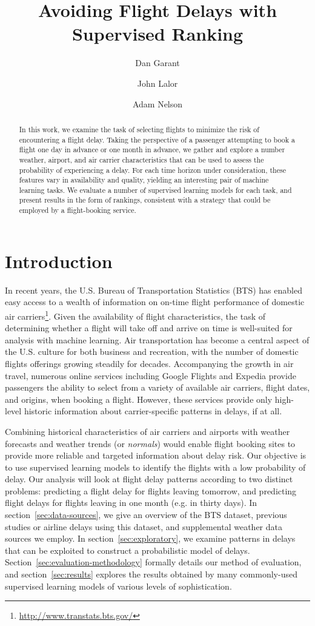 \documentclass{article}
\title{Avoiding Flight Delays with Supervised Ranking}
\author{Dan Garant \and John Lalor \and Adam Nelson}
\date{}
\begin{document}
\maketitle

\begin{abstract}
In this work, we examine the task of selecting flights to minimize the risk of encountering a flight delay.
Taking the perspective of a passenger attempting to book a flight one day in advance or one month in advance, we gather and explore a number weather, airport, and air carrier characteristics that can be used to assess the probability of experiencing a delay.
For each time horizon under consideration, these features vary in availability and quality, yielding an interesting pair of machine learning tasks.
We evaluate a number of supervised learning models for each task, and present results in the form of rankings, consistent with a strategy that could be employed by a flight-booking service.
\end{abstract}

\section{Introduction}

In recent years, the U.S. Bureau of Transportation Statistics (BTS)  has enabled easy access to a wealth of information on on-time flight performance of domestic air carriers\footnote{\url{http://www.transtats.bts.gov/}}.
Given the availability of flight characteristics, the task of determining whether a flight will take off and arrive on time is well-suited for analysis with machine learning.
Air transportation has become a central aspect of the U.S. culture for both business and recreation, with the number of domestic flights offerings growing steadily for decades.
Accompanying the growth in air travel, numerous online services including Google Flights and Expedia provide passengers the ability to select from a variety of available air carriers, flight dates, and origins, when booking a flight.
However, these services provide only high-level historic information about carrier-specific patterns in delays, if at all.

Combining historical characteristics of air carriers and airports with weather forecasts and weather trends (or \emph{normals}) would enable flight booking sites to provide more reliable and targeted information about delay risk.
Our objective is to use supervised learning models to identify the flights with a low probability of delay. Our analysis will look at flight delay patterns according to two distinct problems: predicting a flight delay for flights leaving tomorrow, and predicting flight delays for flights leaving in one month (e.g. in thirty days).
In section~\ref{sec:data-sources}, we give an overview of the BTS dataset, previous studies or airline delays using this dataset, and supplemental weather data sources we employ.
In section~\ref{sec:exploratory}, we examine patterns in delays that can be exploited to construct a probabilistic model of delays.
Section~\ref{sec:evaluation-methodology} formally details our method of evaluation, and section~\ref{sec:results} explores the results obtained by many commonly-used supervised learning models of various levels of sophistication.
\end{document}
